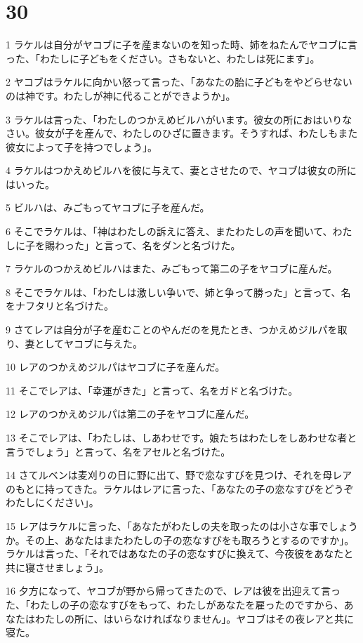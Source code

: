 \chapter{30}

\par 1 ラケルは自分がヤコブに子を産まないのを知った時、姉をねたんでヤコブに言った、「わたしに子どもをください。さもないと、わたしは死にます」。
\par 2 ヤコブはラケルに向かい怒って言った、「あなたの胎に子どもをやどらせないのは神です。わたしが神に代ることができようか」。
\par 3 ラケルは言った、「わたしのつかえめビルハがいます。彼女の所におはいりなさい。彼女が子を産んで、わたしのひざに置きます。そうすれば、わたしもまた彼女によって子を持つでしょう」。
\par 4 ラケルはつかえめビルハを彼に与えて、妻とさせたので、ヤコブは彼女の所にはいった。
\par 5 ビルハは、みごもってヤコブに子を産んだ。
\par 6 そこでラケルは、「神はわたしの訴えに答え、またわたしの声を聞いて、わたしに子を賜わった」と言って、名をダンと名づけた。
\par 7 ラケルのつかえめビルハはまた、みごもって第二の子をヤコブに産んだ。
\par 8 そこでラケルは、「わたしは激しい争いで、姉と争って勝った」と言って、名をナフタリと名づけた。
\par 9 さてレアは自分が子を産むことのやんだのを見たとき、つかえめジルパを取り、妻としてヤコブに与えた。
\par 10 レアのつかえめジルパはヤコブに子を産んだ。
\par 11 そこでレアは、「幸運がきた」と言って、名をガドと名づけた。
\par 12 レアのつかえめジルパは第二の子をヤコブに産んだ。
\par 13 そこでレアは、「わたしは、しあわせです。娘たちはわたしをしあわせな者と言うでしょう」と言って、名をアセルと名づけた。
\par 14 さてルベンは麦刈りの日に野に出て、野で恋なすびを見つけ、それを母レアのもとに持ってきた。ラケルはレアに言った、「あなたの子の恋なすびをどうぞわたしにください」。
\par 15 レアはラケルに言った、「あなたがわたしの夫を取ったのは小さな事でしょうか。その上、あなたはまたわたしの子の恋なすびをも取ろうとするのですか」。ラケルは言った、「それではあなたの子の恋なすびに換えて、今夜彼をあなたと共に寝させましょう」。
\par 16 夕方になって、ヤコブが野から帰ってきたので、レアは彼を出迎えて言った、「わたしの子の恋なすびをもって、わたしがあなたを雇ったのですから、あなたはわたしの所に、はいらなければなりません」。ヤコブはその夜レアと共に寝た。

